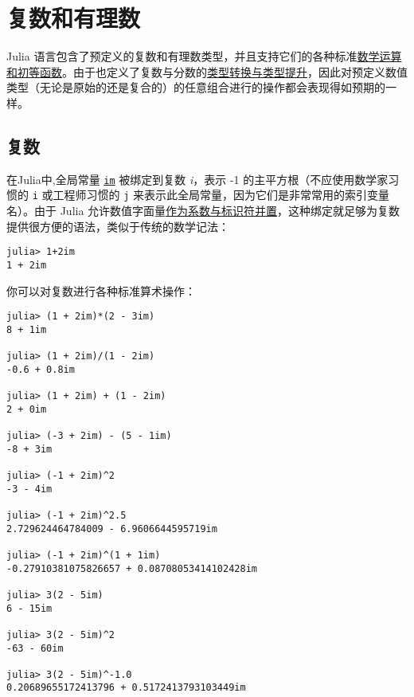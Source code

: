 \chapter{复数和有理数}



Julia 语言包含了预定义的复数和有理数类型，并且支持它们的各种标准\hyperlink{16865688524696028421}{数学运算和初等函数}。由于也定义了复数与分数的\hyperlink{10374023657104680331}{类型转换与类型提升}，因此对预定义数值类型（无论是原始的还是复合的）的任意组合进行的操作都会表现得如预期的一样。



\hypertarget{5868123017618904517}{}


\section{复数}



在Julia中,全局常量 \hyperlink{15097910740298861288}{\texttt{im}} 被绑定到复数 \emph{i}，表示 -1 的主平方根（不应使用数学家习惯的 \texttt{i} 或工程师习惯的 \texttt{j} 来表示此全局常量，因为它们是非常常用的索引变量名）。由于 Julia 允许数值字面量\hyperlink{7285052708387693199}{作为系数与标识符并置}，这种绑定就足够为复数提供很方便的语法，类似于传统的数学记法：




\begin{verbatim}
julia> 1+2im
1 + 2im
\end{verbatim}



你可以对复数进行各种标准算术操作：




\begin{verbatim}
julia> (1 + 2im)*(2 - 3im)
8 + 1im

julia> (1 + 2im)/(1 - 2im)
-0.6 + 0.8im

julia> (1 + 2im) + (1 - 2im)
2 + 0im

julia> (-3 + 2im) - (5 - 1im)
-8 + 3im

julia> (-1 + 2im)^2
-3 - 4im

julia> (-1 + 2im)^2.5
2.729624464784009 - 6.9606644595719im

julia> (-1 + 2im)^(1 + 1im)
-0.27910381075826657 + 0.08708053414102428im

julia> 3(2 - 5im)
6 - 15im

julia> 3(2 - 5im)^2
-63 - 60im

julia> 3(2 - 5im)^-1.0
0.20689655172413796 + 0.5172413793103449im
\end{verbatim}



